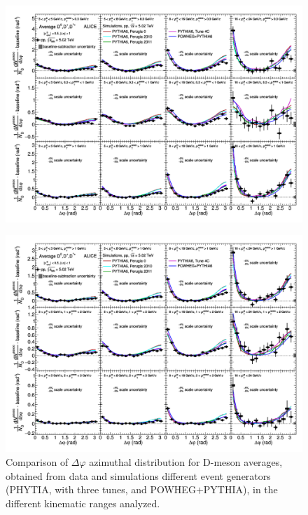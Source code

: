 \begin{figure}[h]
\centering
\includegraphics[width=1.3\textwidth, angle=270]{figures/CfrPPandModels/CorrelationppMC4x6_1New.png}
\end{figure}
\begin{figure}[h]
\centering
\includegraphics[width=1.3\textwidth, angle=270]{figures/CfrPPandModels/CorrelationppMC4x6_2New.png}
\caption{Comparison of $\Delta\varphi$ azimuthal distribution for D-meson averages, obtained from data and simulations different event generators (PHYTIA, with three tunes, and POWHEG$+$PYTHIA), in the different kinematic ranges analyzed.}
\label{fig:pp-models}
\end{figure}

